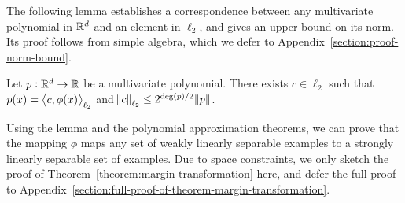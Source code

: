 The following lemma establishes a correspondence between any multivariate
polynomial in $\mathbb{R}^d$ and an element in $\ell_2$, and gives an upper bound on its
norm. Its proof follows from simple algebra, which we defer to
Appendix~\ref{section:proof-norm-bound}.

\begin{lemma}
\label{lemma:norm-bound}
Let $p:\mathbb{R}^d \to \mathbb{R}$ be a multivariate polynomial.
There exists $c \in \ell_2$ such that $p(x) = \left\langle c, \phi(x) \right\rangle_{\ell_2}$
and $\norm{c}_{\ell_2} \le 2^{\deg(p)/2} \norm{p}$.
\end{lemma}

Using the lemma and the polynomial approximation theorems, we can prove that the
mapping $\phi$ maps any set of weakly linearly separable examples to a strongly
linearly separable set of examples. Due to space constraints, we only sketch the
proof of Theorem~\ref{theorem:margin-transformation} here, and defer the full
proof to Appendix~\ref{section:full-proof-of-theorem-margin-transformation}.

